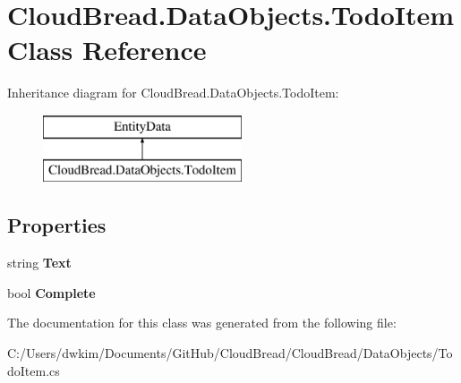\hypertarget{class_cloud_bread_1_1_data_objects_1_1_todo_item}{}\section{Cloud\+Bread.\+Data\+Objects.\+Todo\+Item Class Reference}
\label{class_cloud_bread_1_1_data_objects_1_1_todo_item}
Inheritance diagram for Cloud\+Bread.\+Data\+Objects.\+Todo\+Item\+:\begin{figure}[H]
\begin{center}
\leavevmode
\includegraphics[height=2.000000cm]{class_cloud_bread_1_1_data_objects_1_1_todo_item}
\end{center}
\end{figure}
\subsection*{Properties}
\begin{DoxyCompactItemize}
\item 
string {\bfseries Text}\hypertarget{class_cloud_bread_1_1_data_objects_1_1_todo_item_a92bc3a18d35fe87c89d1209d8962c254}{}\label{class_cloud_bread_1_1_data_objects_1_1_todo_item_a92bc3a18d35fe87c89d1209d8962c254}

\item 
bool {\bfseries Complete}\hypertarget{class_cloud_bread_1_1_data_objects_1_1_todo_item_a0e5fa4c8b2ca710b5065bdbfe695036e}{}\label{class_cloud_bread_1_1_data_objects_1_1_todo_item_a0e5fa4c8b2ca710b5065bdbfe695036e}

\end{DoxyCompactItemize}


The documentation for this class was generated from the following file\+:\begin{DoxyCompactItemize}
\item 
C\+:/\+Users/dwkim/\+Documents/\+Git\+Hub/\+Cloud\+Bread/\+Cloud\+Bread/\+Data\+Objects/Todo\+Item.\+cs\end{DoxyCompactItemize}
